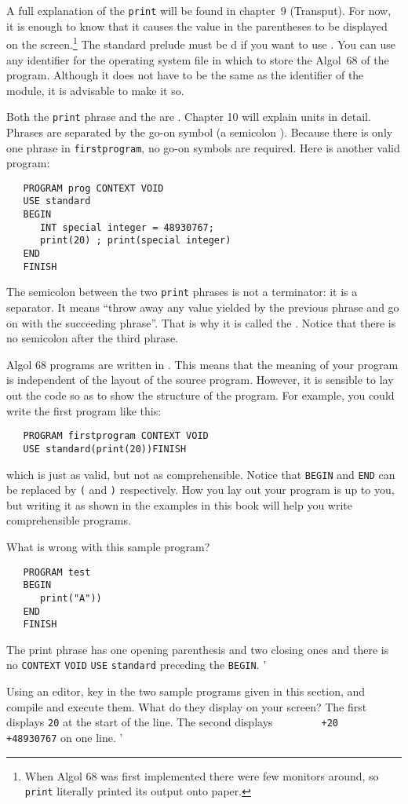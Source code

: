 A full explanation of the \verb|print|  will be found in
chapter~9 (Transput).  For now, it is enough to know that it causes
the value in the parentheses to be displayed on the
screen.\footnote{When Algol 68 was first implemented there were few
monitors around, so \texttt{print} literally printed its output onto
paper.} The standard prelude must be d if you want to use
. You can use any identifier for the operating system
file in which to store the Algol~68
 of the
program. Although it does not have to be the same as the identifier
of the module, it is advisable to make it so.

Both the \verb|print| phrase and the  are
.  Chapter 10 will explain units in detail.  Phrases
are separated by the go-on symbol (a semicolon \ixtt{;}).  Because
there is only one phrase in \verb|firstprogram|, no go-on symbols are
required.  Here is another valid program:
\begin{verbatim}
   PROGRAM prog CONTEXT VOID
   USE standard
   BEGIN
      INT special integer = 48930767;
      print(20) ; print(special integer)
   END
   FINISH
\end{verbatim}
\noindent
The semicolon between the two \verb|print| phrases is not a
terminator: it is a separator.  It means ``throw away any value
yielded by the previous phrase and go on with the succeeding
phrase''.  That is why it is called the
.  Notice that there is no semicolon
after the third phrase.

Algol 68 programs are written in . This means that
the meaning of your program is independent of the layout of the
source program. However, it is sensible to lay out the code so as to
show the structure of the program. For example, you could write the
first program like this:
\begin{verbatim}
   PROGRAM firstprogram CONTEXT VOID
   USE standard(print(20))FINISH
\end{verbatim}
\noindent
which is just as valid, but not as comprehensible. Notice that
\verb|BEGIN| and \verb|END| can be replaced by \verb|(| and \verb|)|
respectively.  How you lay out your program is up to you, but writing
it as shown in the examples in this book will help you write
comprehensible programs.

\begin{exercise}
\item What is wrong with this sample program?
\begin{verbatim}
   PROGRAM test
   BEGIN
      print("A"))
   END
   FINISH
\end{verbatim}
\indent\ans The print phrase has one opening parenthesis and two
closing ones and there is no \verb|CONTEXT| \verb|VOID| \verb|USE|
\verb|standard| preceding the \verb|BEGIN|.
'
\item Using an editor, key in the two sample programs given in this
section, and compile and execute them. What do they display on your
screen?  \ans The first displays \verb|20| at the start of the line.
The second displays \verb*|        +20   +48930767| on one line.
'
\end{exercise}

